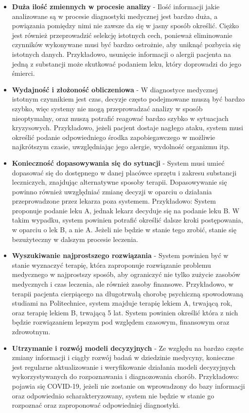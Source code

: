 \begin{itemize}
	\item \textbf{Duża ilość zmiennych w procesie analizy} - Ilość informacji jakie analizowane są w procesie diagnostyki medycznej jest bardzo duża, a powiązania pomiędzy nimi nie zawsze da się w jasny sposób określić. Ciężko jest również przeprowadzić selekcję istotnych cech, ponieważ eliminowanie czynników wykonywane musi być bardzo ostrożnie, aby uniknąć pozbycia się istotnych danych. Przykładowo, usunięcie informacji o alergii pacjenta na jedną z substancji może skutkować podaniem leku, który doprowadzi do jego śmierci.
	\item \textbf{Wydajność i złożoność obliczeniowa} - W diagnostyce medycznej istotnym czynnikiem jest czas, decyzje często podejmowane muszą być bardzo szybko, więc systemy nie mogą przeprowadzać analizy w sposób nieoptymalny, oraz muszą potrafić reagować bardzo szybko w sytuacjach kryzysowych. Przykładowo, jeżeli pacjent dostaje nagłego ataku, system musi określić podanie odpowiedniego środka zapobiegawczego w możliwie najkrótszym czasie, uwzględniając jego alergie, wydolność organizmu itp.
	\item \textbf{Konieczność dopasowywania się do sytuacji} - System musi umieć dopasować się do dostępnego w danej placówce sprzętu i zakresu substancji leczniczych, znajdując alternatywne sposoby terapii. Dopasowywanie się powinno również uwzględniać zmianę decyzji w oparciu o działania przeprowadzone przez lekarza poza systemem. Przykładowo: System proponuje podanie leku A, jednak lekarz decyduje się na podanie leku B. W takim wypadku, system powinien potrafić określić dalsze kroki postępowania, w oparciu o lek B, a nie A. Jeżeli nie będzie w stanie tego zrobić, stanie się bezużyteczny w dalszym procesie leczenia.
	\item \textbf{Wyszukiwanie najprostszego rozwiązania} - System powinien być w stanie wyznaczyć terapię, która zaproponuje rozwiązanie problemu medycznego w najprostszy sposób, aby ograniczyć nie tylko zużycie zasobów medycznych i czas leczenia, ale również zasoby finansowe. Przykładowo, w terapii pacjenta cierpiącego na długotrwałą chorobę psychiczną spowodowaną studiami na Politechnice, system znajduje terapię lekiem A, trwającą rok, oraz terapię lekiem B, trwającą 5 lat. System powinien określić która z nich będzie rozwiązaniem lepszym pod względem czasowym, finansowym oraz zdrowotnym.
	\item \textbf{Utrzymanie i rozwój modeli decyzyjnych} - Ze względu na bardzo częste zmiany informacji i ciągły rozwój badań w dziedzinie medycyny, konieczne jest regularne aktualizowanie i weryfikowanie działania modeli decyzyjnych wykorzystywanych do rozpoznawania i diagnozowania chorób. Przykładowo: pojawia się COVID-19, jeżeli nie zostanie on wprowadzony do bazy informacji oraz odpowiednio scharakteryzowany, system nie będzie w stanie go rozpoznać oraz zaproponować odpowiedniej diagnostyki.
\end{itemize}